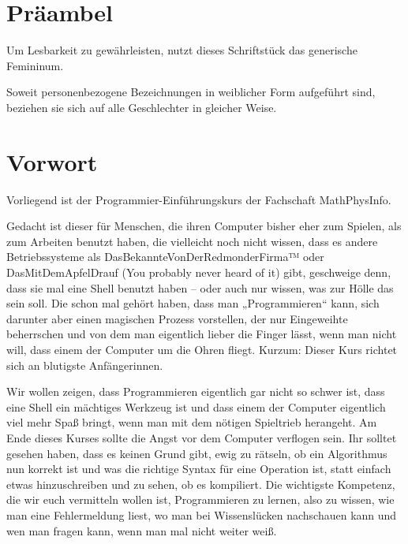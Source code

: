 \documentclass{vorkurs}
\begin{document}



\chapter*{Präambel}
\thispagestyle{empty}
Um Lesbarkeit zu gewährleisten, nutzt dieses Schriftstück das generische
Femininum.

Soweit personenbezogene Bezeichnungen in weiblicher Form aufgeführt sind,
beziehen sie sich auf alle Geschlechter in gleicher Weise.

\clearpage

\chapter*{Vorwort}
\thispagestyle{empty}
\pagestyle{empty}

Vorliegend ist der Programmier-Einführungskurs der Fachschaft MathPhysInfo.

Gedacht ist dieser für Menschen, die ihren Computer bisher eher zum Spielen,
als zum Arbeiten benutzt haben, die vielleicht noch nicht wissen, dass es
andere Betriebssysteme als DasBekannteVonDerRedmonderFirma™ oder
DasMitDemApfelDrauf (You probably never heard of it) gibt, geschweige denn,
dass sie mal eine Shell benutzt haben -- oder auch nur wissen, was zur Hölle das
sein soll.  Die schon mal gehört haben, dass man „Programmieren“ kann, sich
darunter aber einen magischen Prozess vorstellen, der nur Eingeweihte
beherrschen und von dem man eigentlich lieber die Finger lässt, wenn man nicht
will, dass einem der Computer um die Ohren fliegt.  Kurzum: Dieser Kurs richtet
sich an blutigste Anfängerinnen.

Wir wollen zeigen, dass Programmieren eigentlich gar nicht so schwer ist, dass
eine Shell ein mächtiges Werkzeug ist und dass einem der Computer eigentlich
viel mehr Spaß bringt, wenn man mit dem nötigen Spieltrieb herangeht.  Am Ende
dieses Kurses sollte die Angst vor dem Computer verflogen sein. Ihr solltet
gesehen haben, dass es keinen Grund gibt, ewig zu rätseln, ob ein Algorithmus
nun korrekt ist und was die richtige Syntax für eine Operation ist, statt
einfach etwas hinzuschreiben und zu sehen, ob es kompiliert.  Die wichtigste
Kompetenz, die wir euch vermitteln wollen ist, Programmieren zu lernen, also zu
wissen, wie man eine Fehlermeldung liest, wo man bei Wissenslücken nachschauen
kann und wen man fragen kann, wenn man mal nicht weiter weiß.
\end{document}
